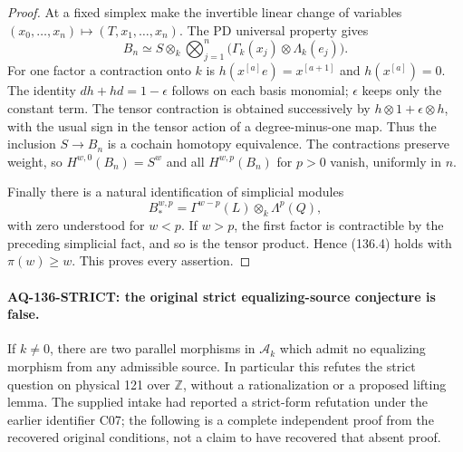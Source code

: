 \begin{proof}
At a fixed simplex make the invertible linear change of
variables $(x_0,\ldots,x_n)\mapsto(T,x_1,\ldots,x_n)$.
The PD universal property gives
\[
 B_n\simeq S\otimes_k\bigotimes_{j=1}^n
            \bigl(\Gamma_k(x_j)\otimes\Lambda_k(e_j)\bigr).
                                                               \tag{136.6}
\]
For one factor a contraction onto $k$ is
$h(x^{[a]}e)=x^{[a+1]}$ and $h(x^{[a]})=0$.
The identity $dh+hd=1-\epsilon$ follows on each basis
monomial; $\epsilon$ keeps only the constant term.
The tensor contraction is obtained successively by
$h\otimes1+\epsilon\otimes h$, with the usual sign in the
tensor action of a degree-minus-one map.  Thus the inclusion
$S\to B_n$ is a cochain homotopy equivalence.  The contractions
preserve weight, so $H^{w,0}(B_n)=S^w$ and all
$H^{w,p}(B_n)$ for $p>0$ vanish, uniformly in $n$.

Finally there is a natural identification of simplicial modules
\[
 B_*^{w,p}=\Gamma^{w-p}(L)\otimes_k\Lambda^p(Q),             \tag{136.7}
\]
with zero understood for $w<p$.  If $w>p$, the first factor
is contractible by the preceding simplicial fact, and so is
the tensor product.  Hence (136.4) holds with
$\pi(w)\geq w$.  This proves every assertion.
\end{proof}

\paragraph{AQ-136-STRICT: the original strict equalizing-source conjecture is false.}
If $k\ne0$, there are two parallel morphisms in
$\mathcal A_k$ which admit no equalizing morphism from any
admissible source.  In particular this refutes the strict
question on physical 121 over $\mathbb Z$, without a
rationalization or a proposed lifting lemma.
The supplied intake had reported a strict-form refutation
under the earlier identifier C07; the following is a complete
independent proof from the recovered original conditions,
not a claim to have recovered that absent proof.


